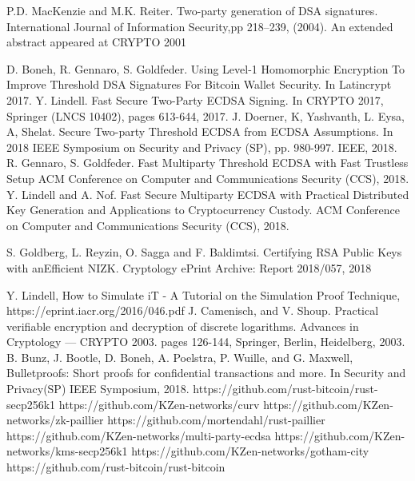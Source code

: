 \documentclass[runningheads]{llncs}
\begin{document}
\begin{thebibliography}{8}
P.D. MacKenzie and M.K. Reiter. Two-party generation of DSA signatures. International
Journal of Information Security,pp 218–239, (2004). An extended
abstract appeared at CRYPTO 2001

D. Boneh, R. Gennaro, S. Goldfeder. Using Level-1 Homomorphic Encryption To
Improve Threshold DSA Signatures For Bitcoin
Wallet Security. In Latincrypt 2017.
Y. Lindell. Fast Secure Two-Party ECDSA Signing. 
In CRYPTO 2017, Springer (LNCS 10402), pages 613-644, 2017.
J. Doerner, K, Yashvanth, L. Eysa, A, Shelat. Secure Two-party Threshold ECDSA from ECDSA Assumptions. In 2018 IEEE Symposium on Security and Privacy (SP), pp. 980-997. IEEE, 2018.
R. Gennaro, S. Goldfeder. Fast Multiparty Threshold ECDSA with Fast Trustless Setup  
ACM Conference on Computer and Communications Security (CCS), 2018.
Y. Lindell and A. Nof. Fast Secure Multiparty ECDSA with Practical Distributed Key Generation and Applications to Cryptocurrency Custody. 
ACM Conference on Computer and Communications Security (CCS), 2018.

S. Goldberg, L. Reyzin, O. Sagga and F. Baldimtsi. Certifying RSA Public Keys with anEfficient NIZK. Cryptology ePrint Archive: Report 2018/057, 2018

Y. Lindell, How to Simulate iT - A Tutorial on the Simulation Proof Technique, https://eprint.iacr.org/2016/046.pdf
J. Camenisch, and V. Shoup. Practical verifiable encryption and decryption of discrete logarithms. Advances in Cryptology — CRYPTO 2003. pages 126-144, Springer, Berlin, Heidelberg, 2003.
B. Bunz, J. Bootle, D. Boneh, A. Poelstra, P. Wuille, and G. Maxwell,
Bulletproofs: Short proofs for confidential transactions and more. In Security and Privacy(SP) IEEE Symposium, 2018.
https://github.com/rust-bitcoin/rust-secp256k1
https://github.com/KZen-networks/curv
https://github.com/KZen-networks/zk-paillier
https://github.com/mortendahl/rust-paillier
https://github.com/KZen-networks/multi-party-ecdsa
https://github.com/KZen-networks/kms-secp256k1
https://github.com/KZen-networks/gotham-city
https://github.com/rust-bitcoin/rust-bitcoin
\end{thebibliography}
\end{document}
